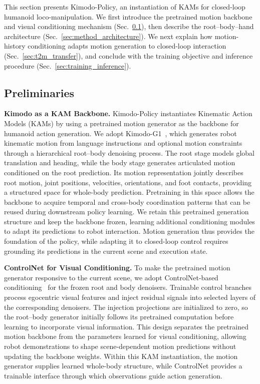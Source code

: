 This section presents Kimodo-Policy, an instantiation of KAMs for closed-loop humanoid loco-manipulation. We first introduce the pretrained motion backbone and visual conditioning mechanism (Sec.~\ref{sec:method_preliminaries}), then describe the root--body--hand architecture (Sec.~\ref{sec:method_architecture}). We next explain how motion-history conditioning adapts motion generation to closed-loop interaction (Sec.~\ref{sec:t2m_transfer}), and conclude with the training objective and inference procedure (Sec.~\ref{sec:training_inference}).

\subsection{Preliminaries}
\label{sec:method_preliminaries}

\textbf{Kimodo as a KAM Backbone.} Kimodo-Policy instantiates Kinematic Action Models (KAMs) by using a pretrained motion generator as the backbone for humanoid action generation. We adopt Kimodo-G1~\citep{kimodo}, which generates robot kinematic motion from language instructions and optional motion constraints through a hierarchical root--body denoising process. The root stage models global translation and heading, while the body stage generates articulated motion conditioned on the root prediction. Its motion representation jointly describes root motion, joint positions, velocities, orientations, and foot contacts, providing a structured space for whole-body prediction. Pretraining in this space allows the backbone to acquire temporal and cross-body coordination patterns that can be reused during downstream policy learning. We retain this pretrained generation structure and keep the backbone frozen, learning additional conditioning modules to adapt its predictions to robot interaction. Motion generation thus provides the foundation of the policy, while adapting it to closed-loop control requires grounding its predictions in the current scene and execution state.

\textbf{ControlNet for Visual Conditioning.} To make the pretrained motion generator responsive to the current scene, we adopt ControlNet-based conditioning~\citep{zhang2023adding} for the frozen root and body denoisers. Trainable control branches process egocentric visual features and inject residual signals into selected layers of the corresponding denoisers. The injection projections are initialized to zero, so the root--body generator initially follows its pretrained computation before learning to incorporate visual information. This design separates the pretrained motion backbone from the parameters learned for visual conditioning, allowing robot demonstrations to shape scene-dependent motion predictions without updating the backbone weights. Within this KAM instantiation, the motion generator supplies learned whole-body structure, while ControlNet provides a trainable interface through which observations guide action generation.

